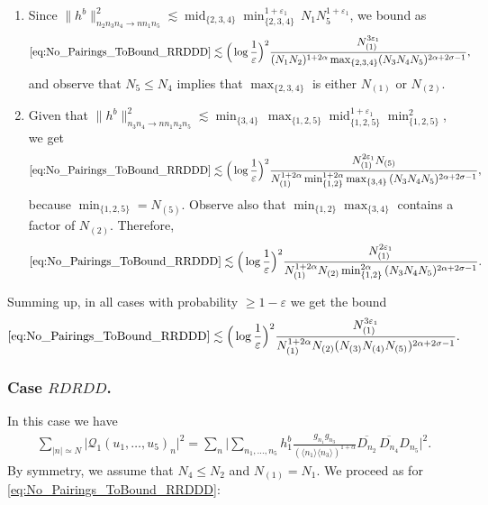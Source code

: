\documentclass[11pt, xcolor = dvipsnames,reqno
]{amsart}
\theoremstyle{definition}
\theoremstyle{remark}
\begin{document}
\begin{itemize}
\begin{enumerate}
    \item Since $\lVert  h^b \rVert_{n_2n_3n_4 \to nn_1n_5}^2
    \lesssim 
    \operatorname{mid}_{\{2,3,4\}} \operatorname{min}_{\{2,3,4\}}^{1+\varepsilon_1} \, N_1 N_5^{1+\varepsilon_1}$, we bound as
    \begin{align*}
        \eqref{eq:No_Pairings_ToBound_RRDDD} &\lesssim \Big(\log \frac{1}{\varepsilon} \Big)^2 \frac{N_{(1)}^{3\varepsilon_1}}{ (N_1 N_2)^{1 + 2\alpha} \max_{\{2,3,4\}}  (N_3N_4N_5)^{2 \alpha + 2\sigma - 1}},
    \end{align*}
    and observe that $N_5 \leq N_4$ implies that $\operatorname{max}_{\{2,3,4\}}$ is either $N_{(1)}$ or $N_{(2)}$. 
    
    \item Given that $\lVert  h^b \rVert_{n_3n_4 \to nn_1n_2n_5}^2
    \lesssim
    \operatorname{min}_{\{3,4\}} \, \operatorname{max}_{\{1,2,5\}} \operatorname{mid}_{\{1,2,5\}}^{1+\varepsilon_1} \operatorname{min}_{\{1,2,5\}}^2$, 
    we get 
    \begin{align*}
        \eqref{eq:No_Pairings_ToBound_RRDDD} \lesssim \Big(\log \frac{1}{\varepsilon} \Big)^2 \frac{N_{(1)}^{2\varepsilon_1} N_{(5)}}{ N_{(1)}^{1+2\alpha} \min_{\{1,2\}}^{1+2\alpha}\operatorname{max}_{\{3,4\}} \, (N_3N_4N_5)^{2 \alpha + 2\sigma - 1}}, 
    \end{align*}
    because $\min_{\{1,2,5\}} = N_{(5)}$. 
    Observe also that $\operatorname{min}_{\{1,2\}}\operatorname{max}_{\{3,4\}}$ contains a factor of $N_{(2)}$.
    Therefore, 
    \begin{align*}
        \eqref{eq:No_Pairings_ToBound_RRDDD} \lesssim \Big(\log \frac{1}{\varepsilon} \Big)^2 \frac{N_{(1)}^{2\varepsilon_1} }{ N_{(1)}^{1+2\alpha} N_{(2)} \min_{\{1,2\}}^{2\alpha}\, (N_3N_4N_5)^{2 \alpha + 2\sigma - 1}}.
    \end{align*}
\end{enumerate}
Summing up, in all cases with probability $\geq 1 - \varepsilon$ we get the bound
\begin{equation}
    \eqref{eq:No_Pairings_ToBound_RRDDD} 
    \lesssim \Big(\log \frac{1}{\varepsilon} \Big)^2  \frac{N_{(1)}^{3\varepsilon_1}}{N_{(1)}^{1 + 2\alpha} N_{(2)} (N_{(3)}N_{(4)}N_{(5)})^{2 \alpha + 2\sigma - 1}}.
\end{equation}
\end{itemize}


\subsubsection{Case $RDRDD$.}
In this case we have
\begin{align}\label{eq:No_Pairings_ToBound_RDRDD}
    \sum_{|n| \simeq N}  \big| \mathcal{Q}_1(u_1, \ldots, u_5)_n \big|^2
    = \sum_n \Bigg| \sum_{n_1, \ldots, n_5 } h^b_1 \frac{g_{n_1} g_{n_3}}{(\langle n_1 \rangle \langle n_3 \rangle)^{1+\alpha}} \overline{D_{n_2}} \, \overline{D_{n_4}} D_{n_5} \Bigg|^2.
\end{align}
By symmetry, we assume that $N_4 \leq N_2$ and $N_{(1)} = N_1$. 
We proceed as for \eqref{eq:No_Pairings_ToBound_RRDDD}:
\end{document}
